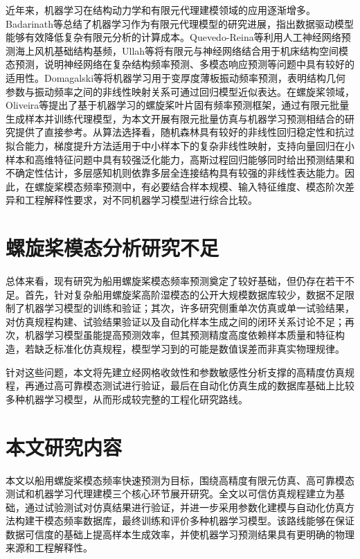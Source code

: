 近年来，机器学习在结构动力学和有限元代理建模领域的应用逐渐增多。Badarinath等总结了机器学习作为有限元代理模型的研究进展，指出数据驱动模型能够有效降低复杂有限元分析的计算成本\cite{intro:7}。Quevedo-Reina等利用人工神经网络预测海上风机基础结构基频，Ullah等将有限元与神经网络结合用于机床结构空间模态预测，说明神经网络在复杂结构频率预测、多模态响应预测等问题中具有较好的适用性\cite{intro:8}\cite{intro:9}。Domagalski等将机器学习用于变厚度薄板振动频率预测，表明结构几何参数与振动频率之间的非线性映射关系可通过回归模型近似表达\cite{intro:11}。在螺旋桨领域，Oliveira等提出了基于机器学习的螺旋桨叶片固有频率预测框架，通过有限元批量生成样本并训练代理模型，为本文开展有限元批量仿真与机器学习预测相结合的研究提供了直接参考\cite{intro:6}。从算法选择看，随机森林具有较好的非线性回归稳定性和抗过拟合能力\cite{intro:14}，梯度提升方法适用于中小样本下的复杂非线性映射\cite{intro:15}，支持向量回归在小样本和高维特征问题中具有较强泛化能力\cite{intro:16}，高斯过程回归能够同时给出预测结果和不确定性估计\cite{intro:17}，多层感知机则依靠多层全连接结构具有较强的非线性表达能力。因此，在螺旋桨模态频率预测中，有必要结合样本规模、输入特征维度、模态阶次差异和工程解释性要求，对不同机器学习模型进行综合比较。

\section{螺旋桨模态分析研究不足}

总体来看，现有研究为船用螺旋桨模态频率预测奠定了较好基础，但仍存在若干不足。首先，针对复杂船用螺旋桨高阶湿模态的公开大规模数据库较少，数据不足限制了机器学习模型的训练和验证；其次，许多研究侧重单次仿真或单一试验结果，对仿真规程构建、试验结果验证以及自动化样本生成之间的闭环关系讨论不足；再次，机器学习模型虽能提高预测效率，但其预测精度高度依赖样本质量和特征构造，若缺乏标准化仿真规程，模型学习到的可能是数值误差而非真实物理规律。

针对这些问题，本文将先建立经网格收敛性和参数敏感性分析支撑的高精度仿真规程，再通过高可靠模态测试进行验证，最后在自动化仿真生成的数据库基础上比较多种机器学习模型，从而形成较完整的工程化研究路线。

\section{本文研究内容}

本文以船用螺旋桨模态频率快速预测为目标，围绕高精度有限元仿真、高可靠模态测试和机器学习代理建模三个核心环节展开研究。全文以可信仿真规程建立为基础，通过试验测试对仿真结果进行验证，并进一步采用参数化建模与自动化仿真方法构建干模态频率数据库，最终训练和评价多种机器学习模型。该路线能够在保证数据可信度的基础上提高样本生成效率，并使机器学习预测结果具有更明确的物理来源和工程解释性。

